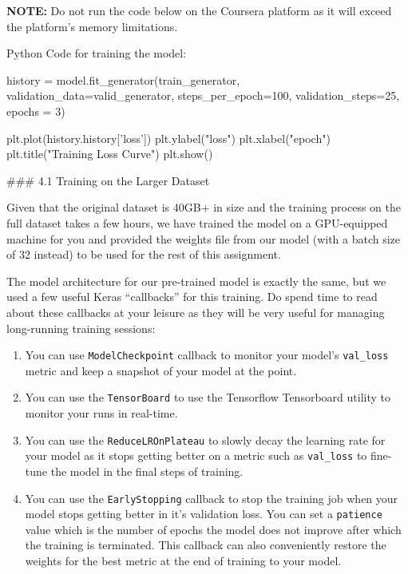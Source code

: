 \documentclass[11pt]{article}
\providecommand{\tightlist}{%
      \setlength{\itemsep}{0pt}\setlength{\parskip}{0pt}}
\newenvironment{Shaded}{}{}
\newcommand{\DecValTok}[1]{\textcolor[rgb]{0.25,0.63,0.44}{{#1}}}
\newcommand{\StringTok}[1]{\textcolor[rgb]{0.25,0.44,0.63}{{#1}}}
\newcommand{\NormalTok}[1]{{#1}}
\newcommand{\OperatorTok}[1]{\textcolor[rgb]{0.40,0.40,0.40}{{#1}}}
\begin{document}
\textbf{NOTE:} Do not run the code below on the Coursera platform as it
will exceed the platform's memory limitations.

Python Code for training the model:

\begin{Shaded}
\begin{Highlighting}[]
\NormalTok{history }\OperatorTok{=}\NormalTok{ model.fit_generator(train_generator, }
\NormalTok{                              validation_data}\OperatorTok{=}\NormalTok{valid_generator,}
\NormalTok{                              steps_per_epoch}\OperatorTok{=}\DecValTok{100}\NormalTok{, }
\NormalTok{                              validation_steps}\OperatorTok{=}\DecValTok{25}\NormalTok{, }
\NormalTok{                              epochs }\OperatorTok{=} \DecValTok{3}\NormalTok{)}

\NormalTok{plt.plot(history.history[}\StringTok{'loss'}\NormalTok{])}
\NormalTok{plt.ylabel(}\StringTok{"loss"}\NormalTok{)}
\NormalTok{plt.xlabel(}\StringTok{"epoch"}\NormalTok{)}
\NormalTok{plt.title(}\StringTok{"Training Loss Curve"}\NormalTok{)}
\NormalTok{plt.show()}
\end{Highlighting}
\end{Shaded}

     \#\#\# 4.1 Training on the Larger Dataset

Given that the original dataset is 40GB+ in size and the training
process on the full dataset takes a few hours, we have trained the model
on a GPU-equipped machine for you and provided the weights file from our
model (with a batch size of 32 instead) to be used for the rest of this
assignment.

The model architecture for our pre-trained model is exactly the same,
but we used a few useful Keras ``callbacks'' for this training. Do spend
time to read about these callbacks at your leisure as they will be very
useful for managing long-running training sessions:

\begin{enumerate}
\def\labelenumi{\arabic{enumi}.}
\tightlist
\item
  You can use \texttt{ModelCheckpoint} callback to monitor your model's
  \texttt{val\_loss} metric and keep a snapshot of your model at the
  point.
\item
  You can use the \texttt{TensorBoard} to use the Tensorflow Tensorboard
  utility to monitor your runs in real-time.
\item
  You can use the \texttt{ReduceLROnPlateau} to slowly decay the
  learning rate for your model as it stops getting better on a metric
  such as \texttt{val\_loss} to fine-tune the model in the final steps
  of training.
\item
  You can use the \texttt{EarlyStopping} callback to stop the training
  job when your model stops getting better in it's validation loss. You
  can set a \texttt{patience} value which is the number of epochs the
  model does not improve after which the training is terminated. This
  callback can also conveniently restore the weights for the best metric
  at the end of training to your model.
\end{enumerate}
\end{document}
